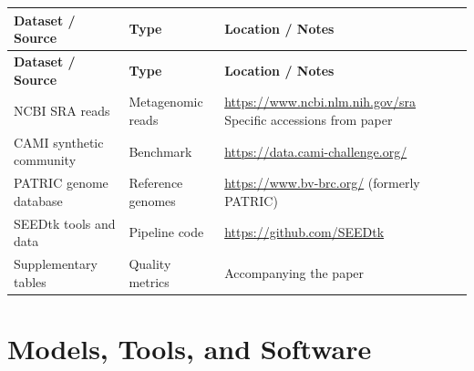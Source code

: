 \documentclass[11pt,a4paper]{article}
\begin{document}
\begin{longtable}{p{4.5cm} p{3.5cm} p{6cm}}
\toprule
\textbf{Dataset / Source} & \textbf{Type} & \textbf{Location / Notes} \\
\midrule
\endfirsthead
\toprule
\textbf{Dataset / Source} & \textbf{Type} & \textbf{Location / Notes} \\
\midrule
\endhead
NCBI SRA reads & Metagenomic reads & \url{https://www.ncbi.nlm.nih.gov/sra} \newline Specific accessions from paper \\
\midrule
CAMI synthetic community & Benchmark & \url{https://data.cami-challenge.org/} \\
\midrule
PATRIC genome database & Reference genomes & \url{https://www.bv-brc.org/} (formerly PATRIC) \\
\midrule
SEEDtk tools and data & Pipeline code & \url{https://github.com/SEEDtk} \\
\midrule
Supplementary tables & Quality metrics & Accompanying the paper \\
\bottomrule
\end{longtable}

\section{Models, Tools, and Software}
\end{document}
